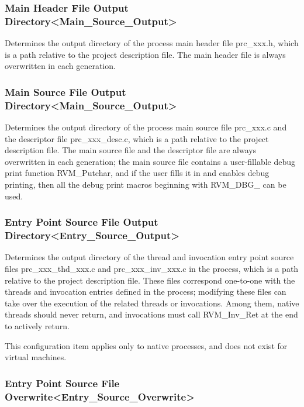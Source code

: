 \subsubsection{Main Header File Output Directory<Main\_Source\_Output>{}}\label{subsubsec:5-3-14-10}

Determines the output directory of the process main header file prc\_xxx.h, which is a path relative to the project description file. The main header file is always overwritten in each generation.

\subsubsection{Main Source File Output Directory<Main\_Source\_Output>{}}\label{subsubsec:5-3-14-11}

Determines the output directory of the process main source file prc\_xxx.c and the descriptor file prc\_xxx\_desc.c, which is a path relative to the project description file. The main source file and the descriptor file are always overwritten in each generation; the main source file contains a user-fillable debug print function RVM\_Putchar, and if the user fills it in and enables debug printing, then all the debug print macros beginning with RVM\_DBG\_ can be used.

\subsubsection{Entry Point Source File Output Directory<Entry\_Source\_Output>{}}\label{subsubsec:5-3-14-12}

Determines the output directory of the thread and invocation entry point source files prc\_xxx\_thd\_xxx.c and prc\_xxx\_inv\_xxx.c in the process, which is a path relative to the project description file. These files correspond one-to-one with the threads and invocation entries defined in the process; modifying these files can take over the execution of the related threads or invocations. Among them, native threads should never return, and invocations must call RVM\_Inv\_Ret at the end to actively return.

This configuration item applies only to native processes, and does not exist for virtual machines.

\subsubsection{Entry Point Source File Overwrite<Entry\_Source\_Overwrite>{}}\label{subsubsec:5-3-14-13}

